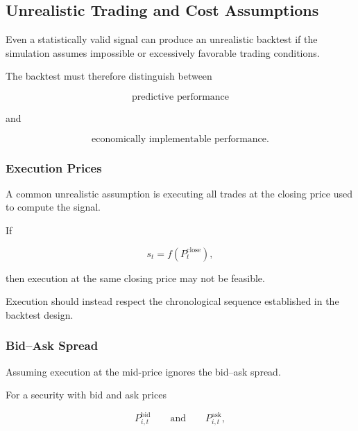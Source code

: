 \documentclass[11pt,a4paper]{article}
\begin{document}
\subsection{Unrealistic Trading and Cost Assumptions}
\label{subsec:unrealistic_trading}

Even a statistically valid signal can produce an unrealistic backtest if the
simulation assumes impossible or excessively favorable trading conditions.

The backtest must therefore distinguish between

\begin{equation}
\boxed{
\text{predictive performance}
}
\end{equation}

and

\begin{equation}
\boxed{
\text{economically implementable performance}.
}
\end{equation}


\subsubsection{Execution Prices}

A common unrealistic assumption is executing all trades at the closing price
used to compute the signal.

If

\begin{equation}
s_t
=
f(P_t^{\mathrm{close}}),
\end{equation}

then execution at the same closing price may not be feasible.

Execution should instead respect the chronological sequence established in the
backtest design.


\subsubsection{Bid--Ask Spread}

Assuming execution at the mid-price ignores the bid--ask spread.

For a security with bid and ask prices

\begin{equation}
P_{i,t}^{\mathrm{bid}}
\qquad\text{and}\qquad
P_{i,t}^{\mathrm{ask}},
\end{equation}
\end{document}
